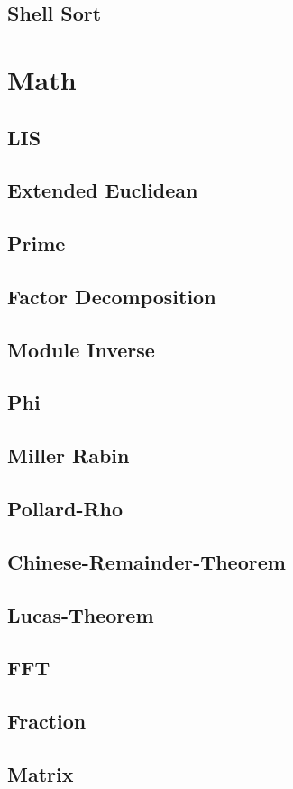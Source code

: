 \documentclass[a4paper,10pt,twocolumn,oneside]{article}
\begin{document}
\subsection{Shell Sort}


\section{Math}
\subsection{LIS}

\subsection{Extended Euclidean}

\subsection{Prime}

\subsection{Factor Decomposition}

\subsection{Module Inverse}

\subsection{Phi}

\subsection{Miller Rabin}

\subsection{Pollard-Rho}

\subsection{Chinese-Remainder-Theorem}

\subsection{Lucas-Theorem}

\subsection{FFT}

\subsection{Fraction}

\subsection{Matrix}


\clearpage
\end{document}
